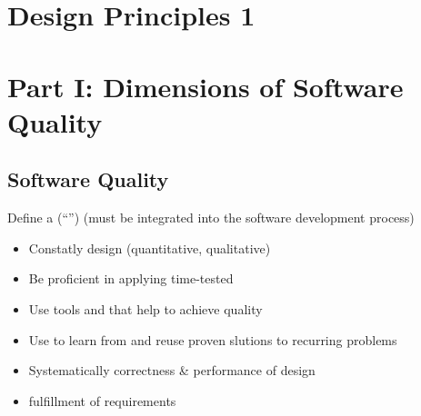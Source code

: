 \section{Design Principles 1}
\section{Part I: Dimensions of Software Quality}
\subsection{Software Quality}
\begin{defBox}[title=How to assure software quality? The big picture]
    Define a  (\enquote{}) (must be integrated into the software development process)
    \begin{itemize}
        \item Constatly  design  (quantitative, qualitative)
        \item Be proficient in applying time-tested 
        \item Use tools and  that help to achieve quality 
        \item Use  to learn from and reuse proven slutions to recurring problems
        \item Systematically  correctness \& performance of design 
        \item{} fulfillment of requirements
    \end{itemize}
\end{defBox}
